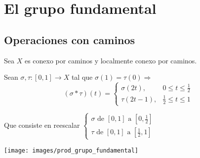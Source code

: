 \chapter{El grupo fundamental}%
\label{cha:el_grupo_fundamental}
\section{Operaciones con caminos}%
\label{sec:operaciones_con_caminos}
Sea $X$ es conexo por caminos y localmente conexo por caminos.
\begin{defi}
Sean $\sigma, \tau: \left[ 0, 1 \right] \rightarrow X$ tal que $\sigma\left( 1 \right) = \tau\left( 0 \right) \Rightarrow$
\[
\left( \sigma * \tau \right)\left( t \right) = \begin{cases}
    \sigma\left( 2 t \right), &0 \le t \le \frac{1}{2}\\
    \tau\left( 2t - 1 \right), &\frac{1}{2} \le t \le 1
\end{cases}
\]

Que consiste en reescalar $\begin{cases}
    \sigma \text{ de } \left[ 0, 1 \right] \text{ a } \left[ 0, \frac{1}{2} \right]\\
    \tau \text{ de } \left[ 0, 1 \right] \text{ a } \left[ \frac{1}{2}, 1 \right] 
\end{cases}$
\end{defi}

\begin{center}
    \texttt{[image: images/prod\_grupo\_fundamental]} 
\end{center}

